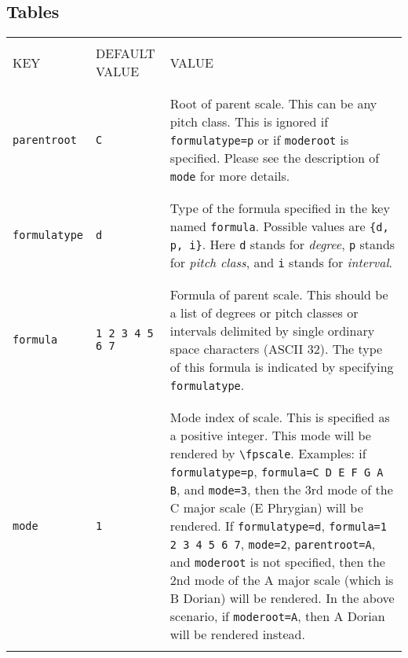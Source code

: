 \documentclass[12pt,letterpaper]{article}
\begin{document}
\subsection{Tables}

\begin{table}[H]\tiny\begin{tabular}{|l|l|p{8cm}|}
\hline

&&\\
KEY & DEFAULT VALUE & VALUE\\
&&\\

\hline

&&\\
\texttt{parentroot} & \texttt{C} & Root of parent scale. This can be any pitch class. This is ignored if \texttt{formulatype=p} or if \texttt{moderoot} is specified. Please see the description of \texttt{mode} for more details.\\
&&\\

\hline

&&\\
\texttt{formulatype} & \texttt{d} & Type of the formula specified in the key named \texttt{formula}. Possible values are \texttt{\{d, p, i\}}. Here \texttt{d} stands for \textit{degree}, \texttt{p} stands for \textit{pitch class}, and \texttt{i} stands for \textit{interval}.\\
&&\\

\hline

&&\\
\texttt{formula} & \texttt{1 2 3 4 5 6 7} & Formula of parent scale. This should be a list of degrees or pitch classes or intervals delimited by single ordinary space characters (ASCII 32). The type of this formula is indicated by specifying \texttt{formulatype}.\\
&&\\

\hline

&&\\
\texttt{mode} & \texttt{1} & Mode index of scale. This is specified as a positive integer. This mode will be rendered by \texttt{\textbackslash fpscale}. Examples: if \texttt{formulatype=p}, \texttt{formula=C D E F G A B}, and \texttt{mode=3}, then the 3rd mode of the C major scale (E Phrygian) will be rendered. If \texttt{formulatype=d}, \texttt{formula=1 2 3 4 5 6 7}, \texttt{mode=2}, \texttt{parentroot=A}, and \texttt{moderoot} is not specified, then the 2nd mode of the A major scale (which is B Dorian) will be rendered. In the above scenario, if \texttt{moderoot=A}, then A Dorian will be rendered instead.\\
&&\\


\end{tabular}
\end{table}
\end{document}
